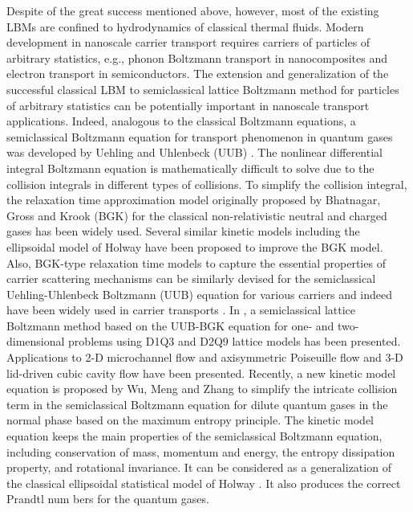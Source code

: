 \documentclass[doublecol]{epl2}
\begin{document}
Despite of the great success mentioned above, however, most of the existing LBMs are confined to hydrodynamics of classical thermal fluids.
Modern development in nanoscale carrier transport requires carriers of particles of arbitrary statistics, e.g., phonon Boltzmann transport in nanocomposites and electron transport in semiconductors. The extension and generalization of the successful classical LBM to semiclassical lattice Boltzmann method for particles of arbitrary statistics can be potentially important in nanoscale transport applications.  Indeed, analogous to the classical Boltzmann equations, a semiclassical Boltzmann equation for transport phenomenon in quantum gases was developed by Uehling and Uhlenbeck (UUB) \cite{Ueh1933}.   The nonlinear differential integral Boltzmann equation is mathematically difficult to solve due to the collision integrals in different types of collisions. To simplify the collision integral, the relaxation time approximation model originally proposed by Bhatnagar, Gross and Krook (BGK) \cite{BGK1954} for the classical non-relativistic neutral and charged gases has been widely used.  Several similar kinetic models including the ellipsoidal model of Holway \cite{Holway1966} have been proposed to improve the BGK model.  Also, BGK-type relaxation time models to capture the essential properties of carrier scattering mechanisms can be similarly devised for the semiclassical Uehling-Uhlenbeck Boltzmann (UUB) equation for various carriers and indeed have been widely used in carrier transports \cite{Lund2000, Chen2005, Kaviany2008}. In \cite{Yang2009}, a semiclassical lattice Boltzmann method based on the UUB-BGK equation for one- and two-dimensional problems using D1Q3 and D2Q9 lattice models has been presented.  Applications to 2-D microchannel flow and axisymmetric Poiseuille flow and 3-D lid-driven cubic cavity flow have been presented.  Recently, a new kinetic model equation is proposed by Wu, Meng and Zhang \cite{Wu2012} to simplify the intricate collision term in the semiclassical Boltzmann equation for dilute quantum gases in the normal phase based on the maximum entropy principle. The kinetic model equation keeps the main properties of the semiclassical Boltzmann equation, including conservation of mass, momentum and energy, the entropy dissipation property, and rotational invariance. It can be considered as a generalization of the classical ellipsoidal statistical model of Holway \cite{Holway1966}. It also produces the correct Prandtl num bers for the quantum gases.
\end{document}
